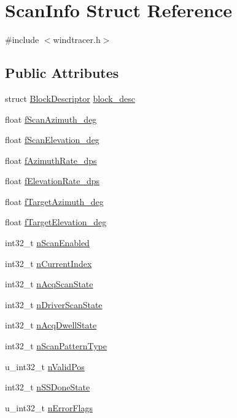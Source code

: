 \hypertarget{structScanInfo}{\section{Scan\-Info Struct Reference}
\label{structScanInfo}
}


{\ttfamily \#include $<$windtracer.\-h$>$}

\subsection*{Public Attributes}
\begin{DoxyCompactItemize}
\item 
struct \hyperlink{structBlockDescriptor}{Block\-Descriptor} \hyperlink{structScanInfo_aa35e33646202e65820e4e5877bb4638a}{block\-\_\-desc}
\item 
float \hyperlink{structScanInfo_a98d65e9d50d3fc3c382c8c30107829df}{f\-Scan\-Azimuth\-\_\-deg}
\item 
float \hyperlink{structScanInfo_af32649e9efdecf231eda758aac971ec3}{f\-Scan\-Elevation\-\_\-deg}
\item 
float \hyperlink{structScanInfo_abe3ee38419275b220a4f25bcfc86eac6}{f\-Azimuth\-Rate\-\_\-dps}
\item 
float \hyperlink{structScanInfo_aaa3e0950a443caa4c6d7ad54657edb5e}{f\-Elevation\-Rate\-\_\-dps}
\item 
float \hyperlink{structScanInfo_aad92fd2f9bbfd1fe8c8e682966cd5236}{f\-Target\-Azimuth\-\_\-deg}
\item 
float \hyperlink{structScanInfo_a26542bea822986447d7f7aba1ec52c1c}{f\-Target\-Elevation\-\_\-deg}
\item 
int32\-\_\-t \hyperlink{structScanInfo_a633fd4a80d1be23089f0447b24fec5d6}{n\-Scan\-Enabled}
\item 
int32\-\_\-t \hyperlink{structScanInfo_a79c26990e78094ff955e9f7bdc8af846}{n\-Current\-Index}
\item 
int32\-\_\-t \hyperlink{structScanInfo_aa96fd85db33fb38d6f8a2dec1e124333}{n\-Acq\-Scan\-State}
\item 
int32\-\_\-t \hyperlink{structScanInfo_a7cd377a6edb4dfb4ff79d77ee9638bda}{n\-Driver\-Scan\-State}
\item 
int32\-\_\-t \hyperlink{structScanInfo_abef44f09d1d490fa380edff9a6d7e501}{n\-Acq\-Dwell\-State}
\item 
int32\-\_\-t \hyperlink{structScanInfo_a3734fd5525b106f219a16d77440170e4}{n\-Scan\-Pattern\-Type}
\item 
u\-\_\-int32\-\_\-t \hyperlink{structScanInfo_a297a9e4889f6caaffba6d3b9c1a9d1dc}{n\-Valid\-Pos}
\item 
int32\-\_\-t \hyperlink{structScanInfo_a4ad5cbb492f1e6042a54c9c2ea3a48be}{n\-S\-S\-Done\-State}
\item 
u\-\_\-int32\-\_\-t \hyperlink{structScanInfo_a9d77d5adef2042b142b23186dcb0635f}{n\-Error\-Flags}
\end{DoxyCompactItemize}


